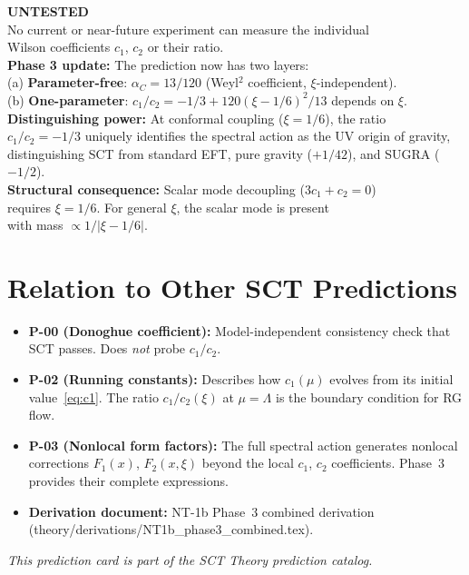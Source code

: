 \documentclass[11pt,a4paper]{article}
\begin{document}
\begin{center}
\colorbox{untested!15}{\parbox{0.85\textwidth}{\centering
  \textbf{\color{untested}\Large UNTESTED}\\[6pt]
  No current or near-future experiment can measure the individual\\
  Wilson coefficients $c_1$, $c_2$ or their ratio.\\[4pt]
  \textbf{Phase 3 update:} The prediction now has two layers:\\[2pt]
  (a) \textbf{Parameter-free}: $\alpha_C = 13/120$ (Weyl$^2$ coefficient, $\xi$-independent).\\
  (b) \textbf{One-parameter}: $c_1/c_2 = -1/3 + 120(\xi-1/6)^2/13$ depends on $\xi$.\\[4pt]
  \textbf{Distinguishing power:} At conformal coupling ($\xi = 1/6$), the ratio\\
  $c_1/c_2 = -1/3$ uniquely identifies the spectral action as the UV origin of gravity,\\
  distinguishing SCT from standard EFT, pure gravity ($+1/42$), and SUGRA ($-1/2$).\\[4pt]
  \textbf{Structural consequence:} Scalar mode decoupling ($3c_1 + c_2 = 0$)\\
  requires $\xi = 1/6$. For general $\xi$, the scalar mode is present\\
  with mass $\propto 1/|\xi - 1/6|$.
}}
\end{center}

\section{Relation to Other SCT Predictions}

\begin{itemize}[leftmargin=2em]
  \item \textbf{P-00 (Donoghue coefficient):} Model-independent consistency check that SCT passes. Does \emph{not} probe $c_1/c_2$.
  \item \textbf{P-02 (Running constants):} Describes how $c_1(\mu)$ evolves from its initial value~\eqref{eq:c1}. The ratio $c_1/c_2(\xi)$ at $\mu = \Lambda$ is the boundary condition for RG flow.
  \item \textbf{P-03 (Nonlocal form factors):} The full spectral action generates nonlocal corrections $F_1(x)$, $F_2(x,\xi)$ beyond the local $c_1$, $c_2$ coefficients. Phase~3 provides their complete expressions.
  \item \textbf{Derivation document:} NT-1b Phase~3 combined derivation (theory/derivations/NT1b\_phase3\_combined.tex).
\end{itemize}

\vspace{1em}
\noindent
\textit{This prediction card is part of the SCT Theory prediction catalog.}
\end{document}
